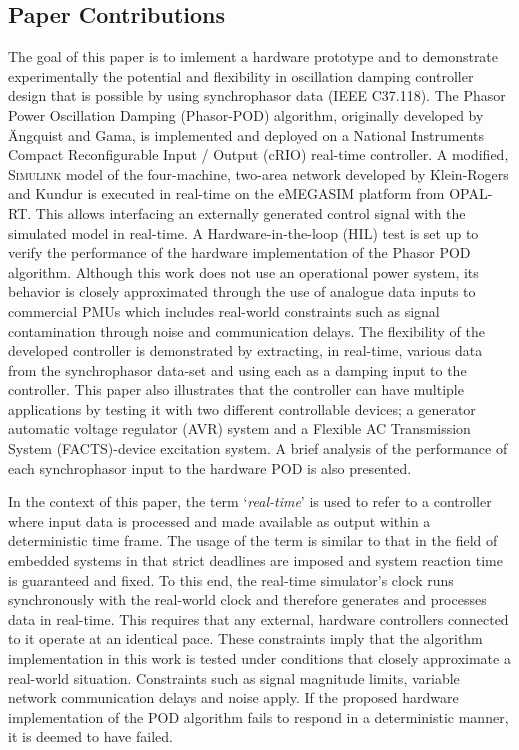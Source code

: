 \documentclass{ieeeaccess}
\begin{document}
\subsection{Paper Contributions}
The goal of this paper is to imlement a hardware prototype and to demonstrate experimentally the potential and flexibility in oscillation damping controller design that is possible by using synchrophasor data (IEEE C37.118). The Phasor Power Oscillation Damping (Phasor-POD) algorithm, originally developed by \"{A}ngquist and Gama\cite{PhasorPOD}, is implemented and deployed on a National Instruments Compact Reconfigurable Input / Output (cRIO) real-time controller. A modified, \textsc{Simulink} model of the four-machine, two-area network developed by Klein-Rogers and Kundur \cite{KundurTwoArea} is executed in real-time on the eMEGASIM \cite{eMEGASIM} platform from OPAL-RT. This allows interfacing an externally generated control signal with the simulated model in real-time. A Hardware-in-the-loop (HIL) test is set up to verify the performance of the hardware implementation of the Phasor POD algorithm. Although this work does not use an operational power system, its behavior is closely approximated through the use of analogue data inputs to commercial PMUs which includes real-world constraints such as signal contamination through noise and communication delays. The flexibility of the developed controller is demonstrated by extracting, in real-time, various data from the synchrophasor data-set and using each as a damping input to the controller. This paper also illustrates that the controller can have multiple applications by testing it with two different controllable devices; a generator automatic voltage regulator (AVR) system and a Flexible AC Transmission System (FACTS)-device excitation system. A brief analysis of the performance of each synchrophasor input to the hardware POD is also presented.

In the context of this paper, the term `\emph{real-time}' is used to refer to a controller where input data is processed and made available as output within a deterministic time frame. The usage of the term is similar to that in the field of embedded systems in that strict deadlines are imposed and system reaction time is guaranteed and fixed. To this end, the real-time simulator's clock runs synchronously with the real-world clock and therefore generates and processes data in real-time. This requires that any external, hardware controllers connected to it operate at an identical pace. These constraints imply that the algorithm implementation in this work is tested under conditions that closely approximate a real-world situation. Constraints such as signal magnitude limits, variable network communication delays and noise apply. If the proposed hardware implementation of the POD algorithm fails to respond in a deterministic manner, it is deemed to have failed.
\end{document}

